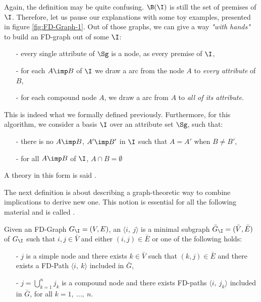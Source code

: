 Again, the definition may be quite confusing. $\B(\I)$ is still the set of premises of $\I$. Therefore, let us pause our explanations with some toy examples, presented in figure \ref{fig:FD-Graph-1}. 
Out of those graphs, we can give a way \textit{"with hands"}
to build an FD-graph out of some $\I$:
\begin{itemize}
	\item[-] every single attribute of $\Sg$ is a node, as every premise of $\I$,
	\item[-] for each $A \imp B$ of $\I$ we draw a  arc from the node
	$A$ to \textit{every attribute} of $B$,
	\item[-] for each compound node $A$, we draw a  arc from
	$A$ to \textit{all of its attribute}.
\end{itemize}
\noindent This is indeed what we formally defined previously. Furthermore, for
this algorithm, we consider a basis $\I$ over an attribute set $\Sg$, such that:
\begin{itemize}
	\item[-] there is no $A \imp B$, $A' \imp B'$ in $\I$ such that $A = A'$ when
	$B \neq B'$,
	\item[-] for all $A \imp B$ of $\I$, $A \cap B = \emptyset$
\end{itemize}
\noindent A theory in this form is said .

\begin{figure}[ht]
	
\end{figure}

\vspace{1.2em}

The next definition is about describing a graph-theoretic way to combine 
implications to derive new one. This notion is essential for all the following 
material and is called .

\begin{definition} Given an FD-Graph $G_{\I} = (V, E)$, an
 $\langle i, \ j \rangle$ is a minimal subgraph 
$\bar{G}_{\I} = (\bar{V}, \bar{E})$ of $G_{\I}$ such that $i, j \in \bar{V}$ 
and either $(i, j) \in \bar{E}$ or one of the following holds:
\begin{itemize}
	\item[-] $j$ is a simple node and there exists $k \in \bar{V}$ such that 
	$(k, j) \in \bar{E}$ and there exists a FD-Path $\langle i, \ k \rangle$ 
	included in $\bar{G}$, 
	 
	\item[-] $j = \bigcup_{k = 1}^n j_k$ is a compound node and there exists 
	FD-paths $\langle i, \ j_k \rangle$ included in $\bar{G}$, for all $k = 
	1, \ \dots, \ n$.
\end{itemize}
	
\end{definition}


